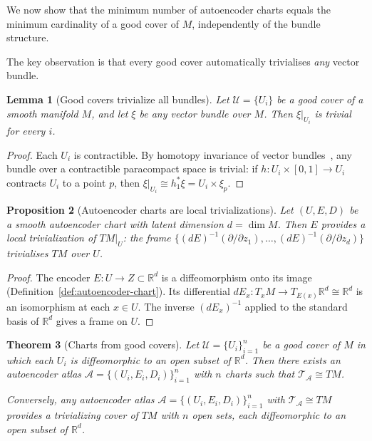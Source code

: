 \documentclass[11pt]{article}
\newcommand{\R}{\mathbb{R}}
\theoremstyle{plain}
\newtheorem{theorem}{Theorem}[section]
\newtheorem{proposition}[theorem]{Proposition}
\newtheorem{lemma}[theorem]{Lemma}
\theoremstyle{definition}
\theoremstyle{remark}
\begin{document}
We now show that the minimum number of autoencoder charts equals the minimum cardinality of a good cover of $M$, independently of the bundle structure.

The key observation is that every good cover automatically trivialises \emph{any} vector bundle.

\begin{lemma}[Good covers trivialize all bundles]\label{lem:good-cover-trivializes}
Let $\mathcal{U} = \{U_i\}$ be a good cover of a smooth manifold $M$, and let $\xi$ be any vector bundle over $M$. Then $\xi|_{U_i}$ is trivial for every $i$.
\end{lemma}

\begin{proof}
Each $U_i$ is contractible. By homotopy invariance of vector bundles~\cite[\S 3]{milnor1974characteristic}, any bundle over a contractible paracompact space is trivial: if $h \colon U_i \times [0,1] \to U_i$ contracts $U_i$ to a point $p$, then $\xi|_{U_i} \cong h_1^*\xi = U_i \times \xi_p$.
\end{proof}

\begin{proposition}[Autoencoder charts are local trivializations]\label{prop:chart-trivialization}
Let $(U, E, D)$ be a smooth autoencoder chart with latent dimension $d = \dim M$. Then $E$ provides a local trivialization of $TM|_U$: the frame $\{(dE)^{-1}(\partial/\partial z_1), \ldots, (dE)^{-1}(\partial/\partial z_d)\}$ trivialises $TM$ over $U$.
\end{proposition}

\begin{proof}
The encoder $E \colon U \to Z \subset \R^d$ is a diffeomorphism onto its image (Definition~\ref{def:autoencoder-chart}). Its differential $dE_x \colon T_xM \to T_{E(x)}\R^d \cong \R^d$ is an isomorphism at each $x \in U$. The inverse $(dE_x)^{-1}$ applied to the standard basis of $\R^d$ gives a frame on $U$.
\end{proof}

\begin{theorem}[Charts from good covers]\label{thm:charts-from-good-covers}
Let $\mathcal{U} = \{U_i\}_{i=1}^n$ be a good cover of $M$ in which each $U_i$ is diffeomorphic to an open subset of $\R^d$. Then there exists an autoencoder atlas $\mathcal{A} = \{(U_i, E_i, D_i)\}_{i=1}^n$ with $n$ charts such that $\mathcal{T}_{\mathcal{A}} \cong TM$.

Conversely, any autoencoder atlas $\mathcal{A} = \{(U_i, E_i, D_i)\}_{i=1}^n$ with $\mathcal{T}_{\mathcal{A}} \cong TM$ provides a trivializing cover of $TM$ with $n$ open sets, each diffeomorphic to an open subset of $\R^d$.
\end{theorem}
\end{document}
